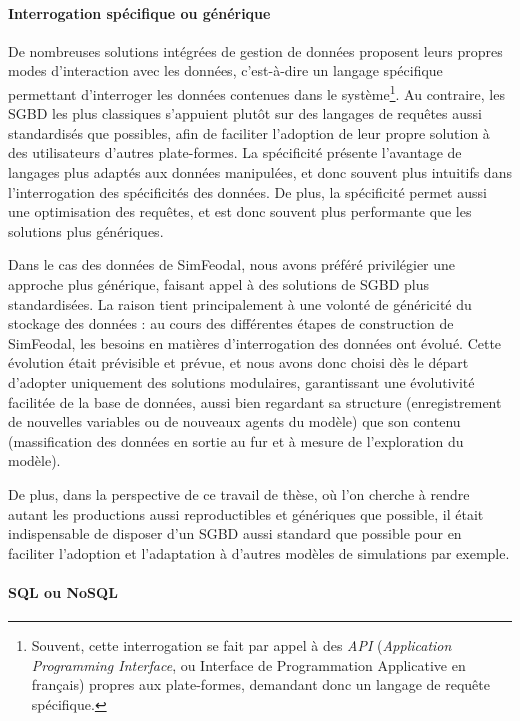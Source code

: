 			\paragraph*{Interrogation spécifique ou générique}\label{par:interrogation-generique}

			De nombreuses solutions intégrées de gestion de données proposent leurs propres modes d'interaction avec les données, c'est-à-dire un langage spécifique permettant d'interroger les données contenues dans le système\footnote{
				Souvent, cette interrogation se fait par appel à des \textit{API} (\textit{Application Programming Interface}, ou Interface de Programmation Applicative en français) propres aux plate-formes, demandant donc un langage de requête spécifique.
			}.
			Au contraire, les SGBD les plus classiques s'appuient plutôt sur des langages de requêtes aussi standardisés que possibles, afin de faciliter l'adoption de leur propre solution à des utilisateurs d'autres plate-formes.
			La spécificité présente l'avantage de langages plus adaptés aux données manipulées, et donc souvent plus intuitifs dans l'interrogation des spécificités des données.
			De plus, la spécificité permet aussi une optimisation des requêtes, et est donc souvent plus performante que les solutions plus génériques.

			Dans le cas des données de SimFeodal, nous avons préféré privilégier une approche plus générique, faisant appel à des solutions de SGBD plus standardisées.
			La raison tient principalement à une volonté de généricité du stockage des données : au cours des différentes étapes de construction de SimFeodal, les besoins en matières d'interrogation des données ont évolué.
			Cette évolution était prévisible et prévue, et nous avons donc choisi dès le départ d'adopter uniquement des solutions modulaires, garantissant une évolutivité facilitée de la base de données, aussi bien regardant sa structure (enregistrement de nouvelles variables ou de nouveaux agents du modèle) que son contenu (massification des données en sortie au fur et à mesure de l'exploration du modèle).

			De plus, dans la perspective de ce travail de thèse, où l'on cherche à rendre autant les productions aussi reproductibles et génériques que possible, il était indispensable de disposer d'un SGBD aussi standard que possible pour en faciliter l'adoption et l'adaptation à d'autres modèles de simulations par exemple.

			\paragraph*{SQL ou NoSQL}\label{par:sql-nosql}

